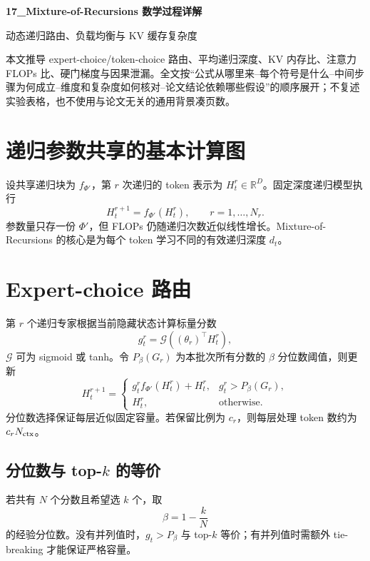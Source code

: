 \documentclass[UTF8,12pt,a4paper,fontset=none]{ctexart}
\numberwithin{equation}{section}
\newcommand{\R}{\mathbb{R}}
\begin{document}
\begin{center}
{\LARGE\bfseries 17\_Mixture-of-Recursions 数学过程详解}\par
\vspace{0.35em}
{\large 动态递归路由、负载均衡与 KV 缓存复杂度}
\end{center}
\vspace{0.45em}
\begin{keybox}[本文只处理真正需要推导的部分]
本文推导 expert-choice/token-choice 路由、平均递归深度、KV 内存比、注意力 FLOPs 比、硬门梯度与因果泄漏。全文按“公式从哪里来--每个符号是什么--中间步骤为何成立--维度和复杂度如何核对--论文结论依赖哪些假设”的顺序展开；不复述实验表格，也不使用与论文无关的通用背景凑页数。
\end{keybox}
\tableofcontents
\newpage

\section{递归参数共享的基本计算图}
设共享递归块为 $f_{\Phi'}$，第 $r$ 次递归的 token 表示为 $H_t^r\in\R^D$。固定深度递归模型执行
\begin{equation}
 H_t^{r+1}=f_{\Phi'}(H_t^r),\qquad r=1,\ldots,N_r.
\end{equation}
参数量只存一份 $\Phi'$，但 FLOPs 仍随递归次数近似线性增长。Mixture-of-Recursions 的核心是为每个 token 学习不同的有效递归深度 $d_t$。

\section{Expert-choice 路由}
第 $r$ 个递归专家根据当前隐藏状态计算标量分数
\begin{equation}
 g_t^r=\mathcal G\!\left((\theta_r)^\top H_t^r\right),
\end{equation}
$\mathcal G$ 可为 sigmoid 或 tanh。令 $P_\beta(G_r)$ 为本批次所有分数的 $\beta$ 分位数阈值，则更新
\begin{equation}
 H_t^{r+1}=\begin{cases}
 g_t^r f_{\Phi'}(H_t^r)+H_t^r,&g_t^r>P_\beta(G_r),\\
 H_t^r,&\text{otherwise}.
 \end{cases}
\end{equation}
分位数选择保证每层近似固定容量。若保留比例为 $c_r$，则每层处理 token 数约为 $c_rN_{\rm ctx}$。

\subsection{分位数与 top-$k$ 的等价}
若共有 $N$ 个分数且希望选 $k$ 个，取
\begin{equation}
 \beta=1-\frac{k}{N}
\end{equation}
的经验分位数。没有并列值时，$g_t>P_\beta$ 与 top-$k$ 等价；有并列值时需额外 tie-breaking 才能保证严格容量。
\end{document}
